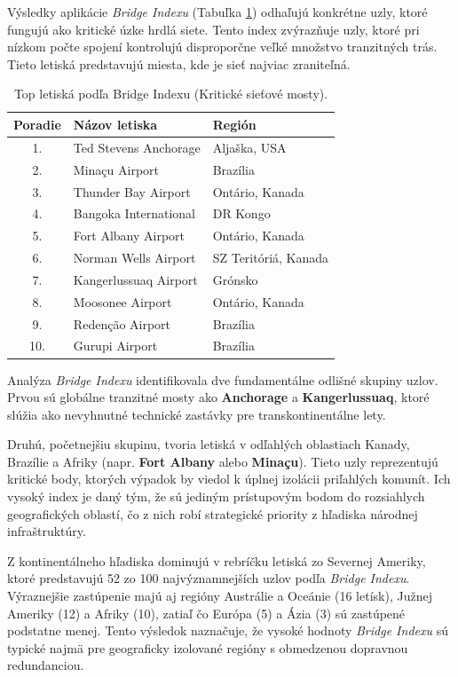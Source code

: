 Výsledky aplikácie \textit{Bridge Indexu} (Tabuľka \ref{tab:bridge_index}) odhaľujú konkrétne uzly, ktoré fungujú ako kritické úzke hrdlá siete.
Tento index zvýrazňuje uzly, ktoré pri nízkom počte spojení kontrolujú disproporčne veľké množstvo tranzitných trás. Tieto letiská predstavujú 
miesta, kde je sieť najviac zraniteľná.

\begin{table}[h!]
\centering
\small
\begin{tabular}{cll}
\hline
\textbf{Poradie} & \textbf{Názov letiska} & \textbf{Región} \\ \hline
1. & Ted Stevens Anchorage & Aljaška, USA \\
2. & Minaçu Airport & Brazília \\
3. & Thunder Bay Airport & Ontário, Kanada \\
4. & Bangoka International & DR Kongo \\
5. & Fort Albany Airport & Ontário, Kanada \\
6. & Norman Wells Airport & SZ Teritóriá, Kanada \\
7. & Kangerlussuaq Airport & Grónsko \\
8. & Moosonee Airport & Ontário, Kanada \\ 
9. & Redenção Airport & Brazília \\ 
10.& Gurupi Airport & Brazília \\ \hline
\end{tabular}
\caption{\centering Top letiská podľa Bridge Indexu (Kritické sieťové mosty).}
\label{tab:bridge_index}
\end{table}

Analýza \textit{Bridge Indexu} identifikovala dve fundamentálne odlišné skupiny uzlov. Prvou sú globálne tranzitné mosty ako \textbf{Anchorage} 
a \textbf{Kangerlussuaq}, ktoré slúžia ako nevyhnutné technické zastávky pre transkontinentálne lety. 

Druhú, početnejšiu skupinu, tvoria letiská v odľahlých oblastiach Kanady, Brazílie a Afriky (napr. \textbf{Fort Albany} alebo \textbf{Minaçu}). Tieto uzly 
reprezentujú kritické body, ktorých výpadok by viedol k úplnej izolácii priľahlých komunít. Ich vysoký 
index je daný tým, že sú jediným prístupovým bodom do rozsiahlych geografických oblastí, čo z nich robí strategické priority z hľadiska národnej 
infraštruktúry.

Z kontinentálneho hľadiska dominujú v rebríčku letiská zo Severnej Ameriky, ktoré predstavujú 52 zo 100 najvýznamnejších uzlov podľa 
\textit{Bridge Indexu}. Výraznejšie zastúpenie majú aj regióny Austrálie a Oceánie (16 letísk), Južnej Ameriky (12) a Afriky (10), 
zatiaľ čo Európa (5) a Ázia (3) sú zastúpené podstatne menej. Tento výsledok naznačuje, že vysoké hodnoty \textit{Bridge Indexu} sú 
typické najmä pre geograficky izolované regióny s obmedzenou dopravnou redundanciou.


